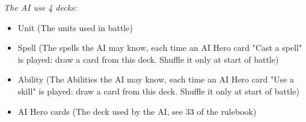 \textit{The AI use 4 decks:}
\begin{itemize}
    \item Unit (The units used in battle)
    \item Spell (The spells the AI may know, each time an AI Hero card "Cast a spell" is played: draw a card from this deck. Shuffle it only at start of battle)
    \item Ability (The Abilities the AI may know, each time an AI Hero card "Use a skill" is played: draw a card from this deck. Shuffle it only at start of battle)
    \item AI Hero cards (The deck used by the AI, see 33 of the rulebook)
\end{itemize}

